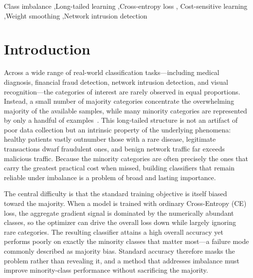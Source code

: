 \documentclass[a4paper,fleqn]{cas-sc}
\begin{document}
\begin{keywords}
Class imbalance \sep Long-tailed learning \sep Cross-entropy loss \sep
Cost-sensitive learning \sep Weight smoothing \sep Network intrusion detection
\end{keywords}

\maketitle

\section{Introduction}\label{sec:intro}

Across a wide range of real-world classification tasks---including medical
diagnosis, financial fraud detection, network intrusion detection, and visual
recognition---the categories of interest are rarely observed in equal
proportions. Instead, a small number of majority categories concentrate the
overwhelming majority of the available samples, while many minority categories
are represented by only a handful of examples~\citep{he2009,johnson2019}. This
long-tailed structure is not an artifact of poor data collection but an intrinsic
property of the underlying phenomena: healthy patients vastly outnumber those
with a rare disease, legitimate transactions dwarf fraudulent ones, and benign
network traffic far exceeds malicious traffic. Because the minority categories
are often precisely the ones that carry the greatest practical cost when missed,
building classifiers that remain reliable under imbalance is a problem of broad
and lasting importance.

The central difficulty is that the standard training objective is itself biased
toward the majority. When a model is trained with ordinary Cross-Entropy (CE)
loss, the aggregate gradient signal is dominated by the numerically abundant
classes, so the optimizer can drive the overall loss down while largely ignoring
rare categories. The resulting classifier attains a high overall accuracy yet
performs poorly on exactly the minority classes that matter most---a failure mode
commonly described as majority bias. Standard accuracy therefore masks the
problem rather than revealing it, and a method that addresses imbalance must
improve minority-class performance without sacrificing the majority.
\end{document}
